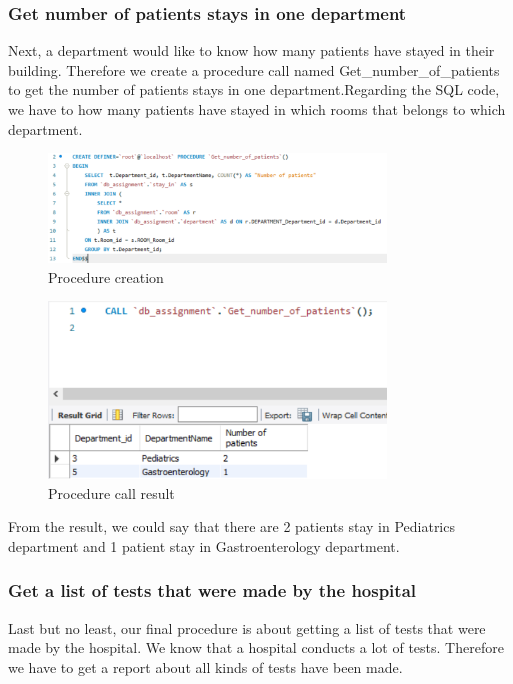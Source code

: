\subsubsection{Get number of patients stays in one department}

Next, a department would like to know how many patients have stayed in their building.
Therefore we create a procedure call named Get\_number\_of\_patients to get the number of patients stays in one department.Regarding the SQL code, we have to how many patients have stayed in which rooms that belongs to which department.

\begin{figure}[H]
  \centering
  \includegraphics[width=0.8\textwidth]{assets/procedure_2a.png}
  \captionsetup{justification=centering,margin=2cm}
  \caption{Procedure creation}
\end{figure}

\begin{figure}[H]
  \centering
  \includegraphics[width=0.8\textwidth]{assets/procedure_2b.png}
  \captionsetup{justification=centering,margin=2cm}
  \caption{Procedure call result}
\end{figure}
From the result, we could say that there are 2 patients stay in Pediatrics department and 1 patient stay in Gastroenterology department.

\subsubsection{Get a list of tests that were made by the hospital}
Last but no least, our final procedure is about getting a list of tests that were made by the hospital.
We know that a hospital conducts a lot of tests.
Therefore we have to get a report about all kinds of tests have been made.

